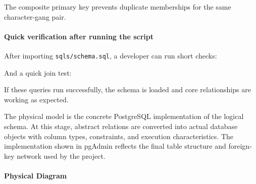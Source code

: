 The composite primary key prevents duplicate memberships for the same
character-gang pair.

\hypertarget{quick-verification-after-running-the-script}{%
\paragraph{Quick verification after running the
script}\label{quick-verification-after-running-the-script}}

After importing \texttt{sqls/schema.sql}, a developer can run short
checks:

\begin{Shaded}
\begin{Highlighting}[]

\end{Highlighting}
\end{Shaded}

And a quick join test:

\begin{Shaded}
\begin{Highlighting}[]
 
 \OperatorTok{=}
 \OperatorTok{=}
 \NormalTok{;}
\end{Highlighting}
\end{Shaded}

If these queries run successfully, the schema is loaded and core
relationships are working as expected.

The physical model is the concrete PostgreSQL implementation of the
logical schema. At this stage, abstract relations are converted into
actual database objects with column types, constraints, and execution
characteristics. The implementation shown in pgAdmin reflects the final
table structure and foreign-key network used by the project.

\hypertarget{physical-diagram}{%
\paragraph{Physical Diagram}\label{physical-diagram}}

